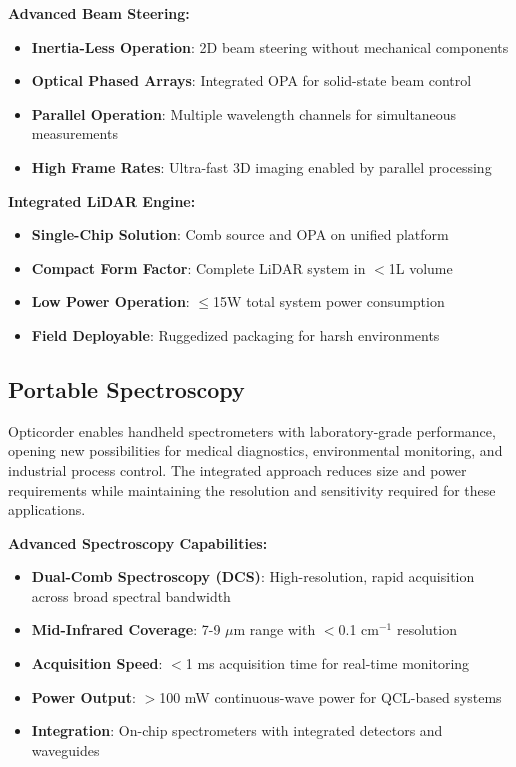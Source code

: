 \documentclass[11pt,a4paper]{article}
\begin{document}
\textbf{Advanced Beam Steering:}
\begin{itemize}
\item \textbf{Inertia-Less Operation}: 2D beam steering without mechanical components
\item \textbf{Optical Phased Arrays}: Integrated OPA for solid-state beam control
\item \textbf{Parallel Operation}: Multiple wavelength channels for simultaneous measurements
\item \textbf{High Frame Rates}: Ultra-fast 3D imaging enabled by parallel processing
\end{itemize}

\textbf{Integrated LiDAR Engine:}
\begin{itemize}
\item \textbf{Single-Chip Solution}: Comb source and OPA on unified platform
\item \textbf{Compact Form Factor}: Complete LiDAR system in $<$1L volume
\item \textbf{Low Power Operation}: $\leq$15W total system power consumption
\item \textbf{Field Deployable}: Ruggedized packaging for harsh environments
\end{itemize}

\subsection{Portable Spectroscopy}
Opticorder enables handheld spectrometers with laboratory-grade performance, opening new possibilities for medical diagnostics, environmental monitoring, and industrial process control. The integrated approach reduces size and power requirements while maintaining the resolution and sensitivity required for these applications.

\textbf{Advanced Spectroscopy Capabilities:}
\begin{itemize}
\item \textbf{Dual-Comb Spectroscopy (DCS)}: High-resolution, rapid acquisition across broad spectral bandwidth
\item \textbf{Mid-Infrared Coverage}: 7-9 $\mu$m range with $<$0.1 cm$^{-1}$ resolution
\item \textbf{Acquisition Speed}: $<$1 ms acquisition time for real-time monitoring
\item \textbf{Power Output}: $>$100 mW continuous-wave power for QCL-based systems
\item \textbf{Integration}: On-chip spectrometers with integrated detectors and waveguides
\end{itemize}
\end{document}
